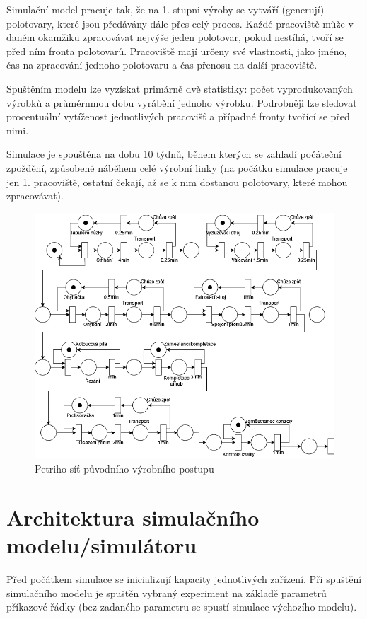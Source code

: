 \documentclass[11pt, a4paper]{article}
\begin{document}
Simulační model pracuje tak, že na 1. stupni výroby se vytváří (generují) polotovary, které jsou předávány dále přes celý proces. Každé pracoviště může v daném okamžiku zpracovávat nejvýše jeden polotovar, pokud nestíhá, tvoří se před ním fronta polotovarů. Pracoviště mají určeny své vlastnosti, jako jméno, čas na zpracování jednoho polotovaru a čas přenosu na další pracoviště.

Spuštěním modelu lze vyzískat primárně dvě statistiky: počet vyprodukovaných výrobků a průměrnmou dobu vyrábění jednoho výrobku. Podrobněji lze sledovat procentuální vytíženost jednotlivých pracovišť a případné fronty tvořící se před nimi.

Simulace je spouštěna na dobu\cite[str. 21]{ims} 10 týdnů, během kterých se zahladí počáteční zpoždění, způsobené náběhem celé výrobní linky (na počátku simulace pracuje jen 1. pracoviště, ostatní čekají, až se k nim dostanou polotovary, které mohou zpracovávat).


\begin{figure}[H]
    \centering
    \includegraphics[width=17cm]{orig}
    \caption{Petriho síť\cite[str. 123]{ims} původního výrobního postupu}
    \label{orig}
\end{figure}

\section{Architektura simulačního modelu/simulátoru}
Před počátkem simulace se inicializují kapacity jednotlivých zařízení. Při spuštění simulačního modelu je spuštěn vybraný experiment na základě parametrů příkazové řádky (bez zadaného parametru se spustí simulace výchozího modelu).
\end{document}
